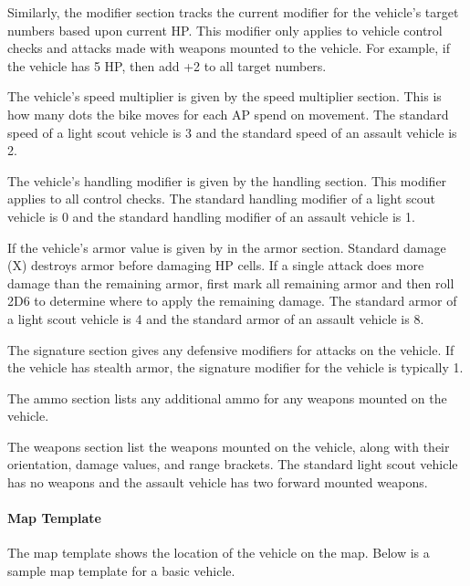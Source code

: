 Similarly, the modifier section tracks the current modifier for the vehicle's target numbers based upon current HP.
This modifier only applies to vehicle control checks and attacks made with weapons mounted to the vehicle.
For example, if the vehicle has 5 HP, then add +2 to all target numbers.

The vehicle's speed multiplier is given by the speed multiplier section.
This is how many dots the bike moves for each AP spend on movement.
The standard speed of a light scout vehicle is 3 and the standard speed of an assault vehicle is 2.

The vehicle's handling modifier is given by the handling section.
This modifier applies to all control checks.
The standard handling modifier of a light scout vehicle is 0 and the standard handling modifier of an assault vehicle is 1.

If the vehicle's armor value is given by in the armor section.
Standard damage (X) destroys armor before damaging HP cells.
If a single attack does more damage than the remaining armor, first mark all remaining armor and then roll 2D6 to determine where to apply the remaining damage.
The standard armor of a light scout vehicle is 4 and the standard armor of an assault vehicle is 8.

The signature section gives any defensive modifiers for attacks on the vehicle.
If the vehicle has stealth armor, the signature modifier for the vehicle is typically 1.

The ammo section lists any additional ammo for any weapons mounted on the vehicle.

The weapons section list the weapons mounted on the vehicle, along with their orientation, damage values, and range brackets.
The standard light scout vehicle has no weapons and the assault vehicle has two forward mounted weapons.

\paragraph*{Map Template}

The map template shows the location of the vehicle on the map.
Below is a sample map template for a basic vehicle.

